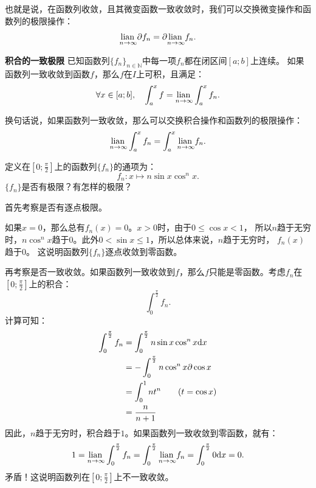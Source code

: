 \documentclass[12pt,UTF8,fontset=none]{ctexbook}
\begin{document}
也就是说，在函数列收敛，且其微变函数一致收敛时，我们可以交换微变操作和函数列的极限操作：
$$ \underset{n\to \infty}{\operatorname{lian}\,} \partial f_n = \partial \underset{n\to \infty}{\operatorname{lian}\,} f_n. $$

\begin{tm}{\textbf{积合的一致极限}}\label{tm:2-1-30}
    已知函数列$\{f_n\}_{n\in\mathbb{N}}$中每一项$f_n$都在闭区间$[a;b]$上连续。
    如果函数列一致收敛到函数$f$，那么$f$在$I$上可积，且满足：
    $$ \forall x \in [a; b],\quad \int_{a}^x f = \underset{n\to \infty}{\operatorname{lian}\,} \int_{a}^x f_n. $$
\end{tm}

换句话说，如果函数列一致收敛，那么可以交换积合操作和函数列的极限操作：
$$ \underset{n\to \infty}{\operatorname{lian}\,} \int_{a}^x f_n = \int_{a}^x \underset{n\to \infty}{\operatorname{lian}\,} f_n. $$

\begin{et}
    定义在$\left[0;\frac{\pi}{2}\right]$上的函数列$\{f_n\}$的通项为：
    $$ f_n: x\mapsto n\sin{x}\cos^n{x}. $$
    $\{f_n\}$是否有极限？有怎样的极限？
\end{et}

\begin{so}
    首先考察是否有逐点极限。

    如果$x = 0$，那么总有$f_n(x) = 0$。$x > 0$时，由于$0\leqslant\cos{x}<1$，
    所以$n$趋于无穷时，$n\cos^n{x}$趋于$0$。此外$0 < \sin{x} \leqslant 1$，所以总体来说，$n$趋于无穷时，
    $f_n(x)$趋于$0$。
    这说明函数列$\{f_n\}$逐点收敛到零函数。

    再考察是否一致收敛。如果函数列一致收敛到$f$，那么$f$只能是零函数。考虑$f_n$在$\left[0;\frac{\pi}{2}\right]$上的积合：
    $$ \int_{0}^{\frac{\pi}{2}} f_n.$$
    计算可知：
    \begin{align*}
        \int_{0}^{\frac{\pi}{2}} f_n &= \int_{0}^{\frac{\pi}{2}} n\sin{x}\cos^n{x} \mathrm{d}x \\
        &= -\int_{0}^{\frac{\pi}{2}} n\cos^n{x} \partial \cos{x} \\
        &= \int_{0}^{1} n t^n \tag{$t = \cos{x}$} \\
        &= \frac{n}{n + 1}
    \end{align*}
    因此，$n$趋于无穷时，积合趋于$1$。如果函数列一致收敛到零函数，就有：
    $$ 1 = \underset{n\to\infty}{\operatorname{lian}\,} \int_{0}^{\frac{\pi}{2}} f_n = \int_{0}^{\frac{\pi}{2}} \underset{n\to\infty}{\operatorname{lian}\,} f_n = \int_{0}^{\frac{\pi}{2}} 0\mathrm{d}x = 0.$$
    矛盾！这说明函数列在$\left[0;\frac{\pi}{2}\right]$上不一致收敛。
\end{so}
\end{document}
